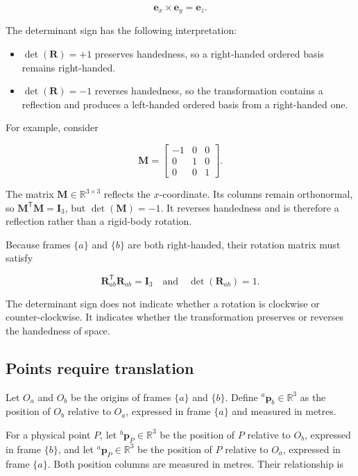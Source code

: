 \documentclass[
  australian,
  12pt,
  letterpaper,
  DIV=11,
  numbers=noendperiod,
  twoside]{scrreprt}
\providecommand{\tightlist}{%
  \setlength{\itemsep}{0pt}\setlength{\parskip}{0pt}}
\begin{document}
\[
\mathbf e_x\times\mathbf e_y=\mathbf e_z.
\]

The determinant sign has the following interpretation:

\begin{itemize}
\tightlist
\item
  \(\det(\mathbf R)=+1\) preserves handedness, so a right-handed ordered
  basis remains right-handed.
\item
  \(\det(\mathbf R)=-1\) reverses handedness, so the transformation
  contains a reflection and produces a left-handed ordered basis from a
  right-handed one.
\end{itemize}

For example, consider

\[
\mathbf M
=
\begin{bmatrix}
-1&0&0\\
0&1&0\\
0&0&1
\end{bmatrix}.
\]

The matrix \(\mathbf M\in\mathbb R^{3\times3}\) reflects the
\(x\)-coordinate. Its columns remain orthonormal, so
\(\mathbf M^{\mathsf T}\mathbf M=\mathbf I_3\), but
\(\det(\mathbf M)=-1\). It reverses handedness and is therefore a
reflection rather than a rigid-body rotation.

Because frames \(\{a\}\) and \(\{b\}\) are both right-handed, their
rotation matrix must satisfy

\[
\boxed{
\mathbf R_{ab}^{\mathsf T}\mathbf R_{ab}=\mathbf I_3
\quad\text{and}\quad
\det(\mathbf R_{ab})=1
}.
\]

The determinant sign does not indicate whether a rotation is clockwise
or counter-clockwise. It indicates whether the transformation preserves
or reverses the handedness of space.

\subsection{Points require
translation}\label{points-require-translation}

Let \(O_a\) and \(O_b\) be the origins of frames \(\{a\}\) and
\(\{b\}\). Define \({}^{a}\mathbf p_b\in\mathbb R^3\) as the position of
\(O_b\) relative to \(O_a\), expressed in frame \(\{a\}\) and measured
in metres.

For a physical point \(P\), let \({}^{b}\mathbf p_P\in\mathbb R^3\) be
the position of \(P\) relative to \(O_b\), expressed in frame \(\{b\}\),
and let \({}^{a}\mathbf p_P\in\mathbb R^3\) be the position of \(P\)
relative to \(O_a\), expressed in frame \(\{a\}\). Both position columns
are measured in metres. Their relationship is
\end{document}
